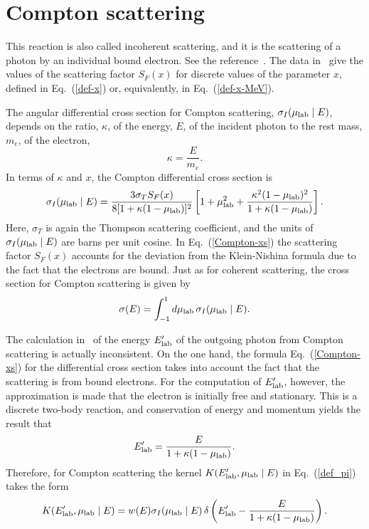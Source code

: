\section{Compton scattering}
This reaction is also called incoherent scattering, and it is
the scattering of a photon by an individual bound electron.
See the reference~\cite{ENDFB}.
The data in \xendl\ give the values
of the scattering factor $S_F(x)$ for discrete values
of the parameter $x$, defined in Eq.~(\ref{def-x})
or, equivalently, in Eq.~(\ref{def-x-MeV}).  

The angular differential cross section for Compton scattering,
$\sigma_I(\mu_{\text{lab}} \mid E)$,
depends on the ratio, $\kappa$, of the energy, $E$, of the incident photon
to the rest mass, $m_e$, of the electron,
\begin{equation}
  \kappa = \frac{E}{m_e}.
  \label{Compton-relative-E}
\end{equation}
In terms of $\kappa$ and $x$, the Compton differential cross section is
\begin{equation}
  \sigma_I(\mu_{\text{lab}} \mid E) =
    \frac{3 \sigma_T S_F(x)}{ 8[ 1 + \kappa(1 - \mu_{\text{lab}})]^2 }
    \left[
      1 + \mu_{\text{lab}}^2 + \frac{\kappa^2 (1 - \mu_{\text{lab}})^2}{1 + \kappa(1 - \mu_{\text{lab}})}
    \right].
  \label{Compton-xs}
\end{equation}
Here, $\sigma_T$ is again the Thompson scattering coefficient, and the
units of $\sigma_I(\mu_{\text{lab}} \mid E)$ are barns per unit cosine.
In Eq.~(\ref{Compton-xs}) the scattering factor $S_F(x)$ accounts
for the deviation from the Klein-Nishina formula due to the fact
that the electrons are bound.
Just as for coherent scattering, the cross section for Compton
scattering is given by
\begin{equation}
  \sigma( E) = \int_{-1}^1 d\mu_{\text{lab}} \, \sigma_I(\mu_{\text{lab}} \mid E).
  \label{Compton-sigma}
\end{equation}

The calculation in \gettransfer\ of the energy $E_{\text{lab}}'$ of the outgoing photon
from Compton scattering is actually inconsistent.  On the one hand, the formula
Eq.~(\ref{Compton-xs}) for the differential cross section takes
into account the fact that the scattering is from bound electrons.
For the computation of $E_{\text{lab}}'$, however,
the approximation is made that the electron is
initially free and stationary.
This is a discrete two-body reaction,
and conservation of energy and momentum yields the result that
\begin{equation}
  E_{\text{lab}}' = \frac{E}{1 + \kappa(1 - \mu_{\text{lab}})}.
  \label{Compton-Eout}
\end{equation}
Therefore, for Compton scattering the kernel $K(E_{\text{lab}}', \mu_{\text{lab}} \mid E)$ 
in Eq.~(\ref{def_pi}) takes the form
\begin{equation}
   K(E_{\text{lab}}', \mu_{\text{lab}} \mid E) = w(E) \sigma_I(\mu_{\text{lab}} \mid E) \,
     \delta\left(
         E_{\text{lab}}' - \frac{E}{1 + \kappa(1 - \mu_{\text{lab}})}
     \right).
  \label{K-Compton}
\end{equation}

